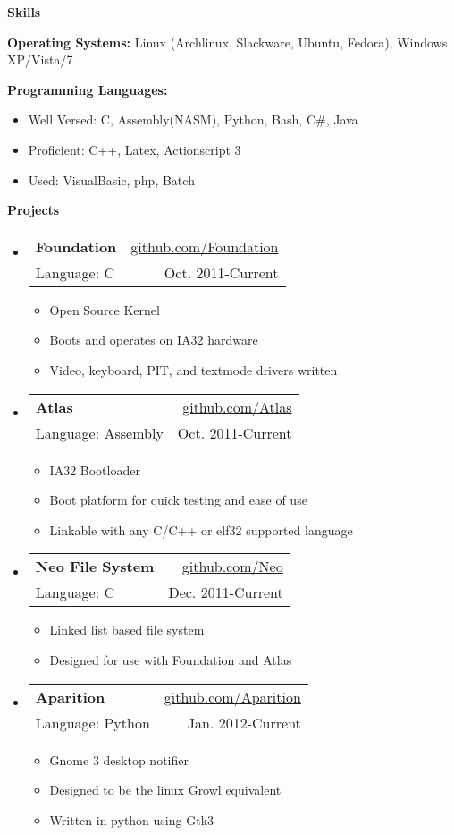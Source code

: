 \documentclass[letterpaper,11pt]{article}
\makeatletter
\newcommand{\resheading}[1]{{\large \colorbox{mygrey}{\begin{minipage}{\textwidth}{\textbf{#1 \vphantom{p\^{E}}}}\end{minipage}}}}
\newcommand{\ressubheading}[4]{
\begin{tabular*}{6.5in}{l@{\extracolsep{\fill}}r}
		\textbf{#1} & #2 \\
		{#3} & {#4} \\
\end{tabular*}\vspace{-6pt}}
\makeatother
\begin{document}
\resheading{{Skills}}
{ \footnotesize
	\begin{description}
		\item{\textbf{Operating Systems: }{Linux (Archlinux, Slackware, Ubuntu, Fedora), Windows XP/Vista/7}}
		\item{\textbf{Programming Languages: }}
			\begin{itemize}
				\item{Well Versed: }{C, Assembly(NASM), Python, Bash, C\#, Java}
				\item{Proficient: }{C++, Latex, Actionscript 3}
				\item{Used: }{VisualBasic, php, Batch}
			\end{itemize}
	\end{description}
}
\resheading{Projects}	
{ \footnotesize
	\begin{itemize}
		\item 
		\ressubheading{Foundation}{\href{http://www.github.com/WillDignazio/Foundation/}{github.com/Foundation}}{\footnotesize{Language: C}}{Oct. 2011-Current}
			\begin{itemize}
				\item{Open Source Kernel}
				\item{Boots and operates on IA32 hardware}
				\item{Video, keyboard, PIT, and textmode drivers written}
			\end{itemize}
		\item		
		\ressubheading{Atlas}{\href{http://www.github.com/WillDignazio/Atlas/}{github.com/Atlas}}{Language: Assembly}{Oct. 2011-Current}
			\begin{itemize}
				\item{IA32 Bootloader} 
				\item{Boot platform for quick testing and ease of use}
				\item{Linkable with any C/C++ or elf32 supported language}
			\end{itemize}
		\item
		\ressubheading{Neo File System}{\href{http://www.github.com/WillDignazio/Neo/}{github.com/Neo}}{Language: C}{Dec. 2011-Current}				
			\begin{itemize}
				\item{Linked list based file system}
				\item{Designed for use with Foundation and Atlas}
			\end{itemize}
		\item
		\ressubheading{Aparition}{\href{http://www.github.com/WillDignazio/aparition/}{github.com/Aparition}}{Language: Python}{Jan. 2012-Current}
			\begin{itemize}
				\item{Gnome 3 desktop notifier}
				\item{Designed to be the linux Growl equivalent}
				\item{Written in python using Gtk3}
			\end{itemize}
	\end{itemize}
}

\end{document}
